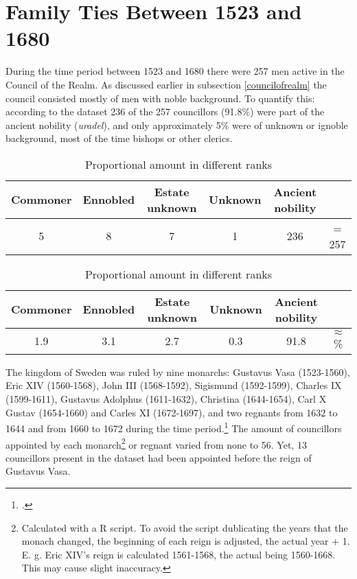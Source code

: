 \section{Family Ties Between 1523 and 1680}
During the time period between 1523 and 1680 there were 257 men active in the Council of the Realm. As discussed earlier in subsection \ref{councilofrealm} the council consisted mostly of men with noble background. To quantify this: according to the dataset 236 of the 257 councillors (91.8\%) were part of the ancient nobility (\textit{uradel}), and only approximately 5\% were of unknown or ignoble background, most of the time bishops or other clerics.  

\begin{table}
	\caption[Absolute amount in different ranks]{Absolute amount in different ranks (Data by \cite{councillorsDS}, statistics by author)}
	\centering
	\begin{tabular}{cccccc}
		\hline
		Commoner & Ennobled & Estate unknown & Unknown & Ancient nobility & \\
		\hline
		5 & 8 & 7 & 1 & 236 & = 257 \\
		\hline
	\end{tabular}
	\caption{Proportional amount in different ranks}
	\centering
	\begin{tabular}{cccccc}
		\hline
	    Commoner & Ennobled & Estate unknown & Unknown & Ancient nobility & \\
	    \hline
	    1.9 & 3.1 & 2.7 & 0.3 & 91.8 & $\approx$ \% \\
	\end{tabular}
\end{table}

The kingdom of Sweden was ruled by nine monarchs: Gustavus Vasa (1523-1560), Eric XIV (1560-1568), John III (1568-1592), Sigismund (1592-1599), Charles IX (1599-1611), Gustavus Adolphus (1611-1632), Christina (1644-1654), Carl X Gustav (1654-1660) and Carles XI (1672-1697), and two regnants from 1632 to 1644 and from 1660 to 1672 during the time period.\footcite[p. 11]{lappalainen06} The amount of councillors appointed by each monarch\footnote{Calculated with a R script. To avoid the script dublicating the years that the monach changed, the beginning of each reign is adjusted, the actual year + 1. E. g. Eric XIV's reign is calculated 1561-1568, the actual being 1560-1668. This may cause slight inaccuracy.} or regnant varied from none to 56. Yet, 13 councillors present in the dataset had been appointed before the reign of Gustavus Vasa.

